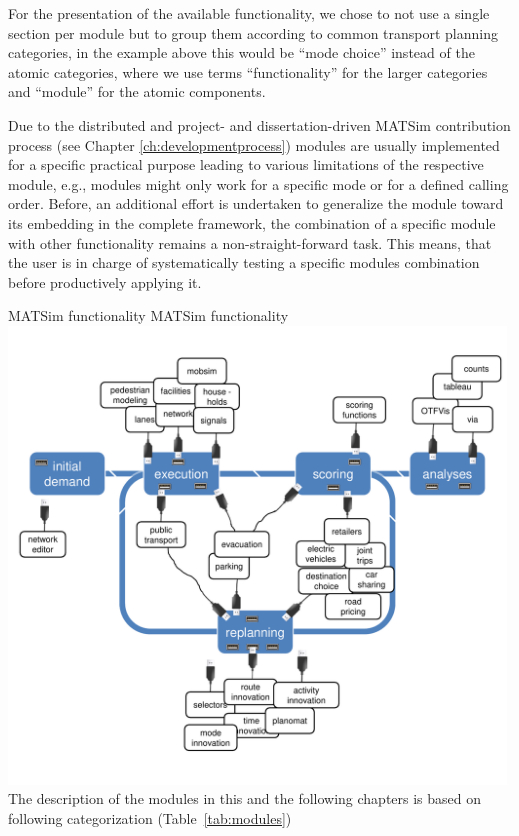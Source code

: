 For the presentation of the available functionality, we chose to not use a single section per module but to group them according to common transport planning categories, in the example above this would be ``mode choice'' instead of the atomic categories, where we use terms ``functionality'' for the larger categories and ``module'' for the atomic components. %

Due to the distributed and project- and dissertation-driven MATSim contribution process (see Chapter \ref{ch:developmentprocess}) modules are usually implemented for a specific practical purpose leading to various limitations of the respective module, e.g., modules might only work for a specific mode or for a defined calling order. Before, an additional effort is undertaken to generalize the module toward its embedding in the complete framework, the combination of a specific module with other functionality remains a non-straight-forward task. This means, that the user is in charge of systematically testing a specific modules combination before productively applying it.

\createfigure%
{MATSim functionality}%
{MATSim functionality}%
{\label{fig:matsimmodules}}%
{\includegraphics[width=0.99\textwidth, angle=0]{extending/figures/modules.pdf}}%
{}
%
The description of the modules in this and the following chapters is based on following categorization (Table~\ref{tab:modules})

